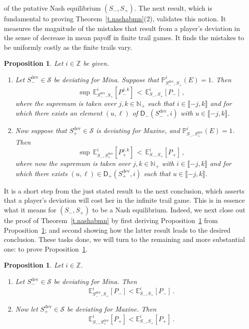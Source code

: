 \documentclass[letterpaper,11pt,oneside,reqno]{amsbook}
\newcommand{\PP}{\ensuremath{\mathbb{P}}}
\newcommand{\N}{\ensuremath{\mathbb{N}}}
\newcommand{\Z}{\ensuremath{\mathbb{Z}}}
\newcommand{\E}[0]{\mathbb{E}}
\numberwithin{figure}{chapter}
\newtheorem{proposition}[theorem]{Proposition}
\theoremstyle{definition}
\theoremstyle{definition}
\theoremstyle{definition}
\theoremstyle{definition}
\theoremstyle{definition}
\newcommand{\mc}{\mathcal}
\newcommand{\nwithoutzero}{\N_+}
\newcommand{\sdev}{S_-^{\textrm{dev}}}
\newcommand{\sdevmaxine}{S_+^{\textrm{dev}}}
\begin{document}
of the putative Nash equilibrium $(S_-,S_+)$. The next result, which is fundamental to proving Theorem~\ref{t.nashabmn}(2), validates this notion. It measures the magnitude of the mistakes that result from a player's deviation in the sense of decrease in mean payoff in finite trail games. It finds the mistakes to be uniformly costly as the finite trails vary.
\begin{proposition}\label{p.jksup}
Let 
$i \in \Z$ be given. 
\begin{enumerate}
\item 
Let $\sdev \in \mc{S}$ be deviating for Mina.  Suppose that $\PP_{\sdev,S_+}^i(E) = 1$.
 Then
$$
\sup \, 
 \E_{\sdev,S_+}^i [P_-^{j,k}]  \, < \, 
 \E_{S_-,S_+}^i [P_-]  \, ,
$$
where the supremum is taken over $j,k \in \nwithoutzero$ such that $i \in \llbracket -j,k \rrbracket$ 
and for which there exists an element $(u,\ell)$ of $\mathsf{D}_-(\sdev,i)$ with $u \in  \llbracket -j,k \rrbracket$.
\item Now suppose that $\sdevmaxine \in \mc{S}$ is deviating for Maxine, and   $\PP_{S_-,\sdevmaxine}^i(E) = 1$.
 Then
$$
\sup \,
 \E_{S_-,\sdevmaxine}^i [P_+^{j,k}]  \, < \, 
 \E_{S_-,S_+}^i [P_+]  \, ,
$$
where now the  supremum is taken over $j,k \in \nwithoutzero$ with $i \in \llbracket -j,k \rrbracket$ and 
for which there exists $(u,\ell) \in \mathsf{D}_+(\sdevmaxine,i)$ such that $u \in  \llbracket -j,k \rrbracket$.
\end{enumerate}
\end{proposition}
It is a short step from the just stated result to the next conclusion, which asserts that a player's deviation will cost her in the infinite trail game. This is in essence what it means for $(S_-,S_+)$
to be a Nash equilibrium. Indeed, we next close out the proof of Theorem~\ref{t.nashabmn} by first deriving Proposition~\ref{p.sminuscomp} from Proposition~\ref{p.jksup}; and second showing how the latter result leads to the desired conclusion. These tasks done, we will turn to the remaining and more substantial one: to prove Proposition~\ref{p.jksup}. 
\begin{proposition}\label{p.sminuscomp}
Let $i \in \Z$. 
\begin{enumerate}
\item Let $\sdev \in \mc{S}$ be deviating for Mina. Then
$$
 \E_{\sdev,S_+}^i [P_-]  <  \E_{S_-,S_+}^i [P_-]  \, .
$$
\item Now  let  $\sdevmaxine \in \mc{S}$ be deviating for Maxine.
 Then
$$
 \E_{S_-,\sdevmaxine}^i [P_+]  <  \E_{S_-,S_+}^i [P_+]  \, .
$$
\end{enumerate}
\end{proposition}
\end{document}
